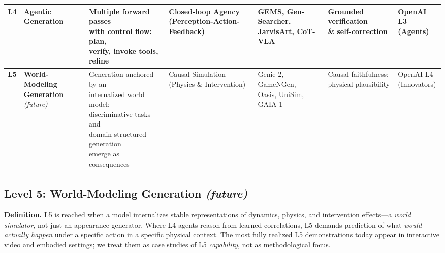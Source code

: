 \begin{table}[!htp]
{\begin{tabular}{@{}c l l l l l l@{}}
        \textbf{L4} & \textbf{Agentic Generation} & \makecell[l]{Multiple forward passes \\ with control flow: plan, \\ verify, invoke tools, refine} & \makecell[l]{Closed-loop Agency \\ (Perception-Action-Feedback)} & \makecell[l]{GEMS, Gen-Searcher, \\ JarvisArt, CoT-VLA} & \makecell[l]{Grounded verification \\ \& self-correction} & \makecell[l]{OpenAI L3 \\ (Agents)} \\ \midrule
        \textbf{L5} & \makecell[l]{\textbf{World-Modeling} \\ \textbf{Generation} \textit{(future)}} & \makecell[l]{Generation anchored by an \\ internalized world model; \\ discriminative tasks and \\ domain-structured generation \\ emerge as consequences} & \makecell[l]{Causal Simulation \\ (Physics \& Intervention)} & \makecell[l]{Genie 2, GameNGen, \\ Oasis, UniSim, GAIA-1} & \makecell[l]{Causal faithfulness; \\ physical plausibility} & \makecell[l]{OpenAI L4 \\ (Innovators)} \\
        \bottomrule[1pt]
    \end{tabular}%
    }
\end{table}



\subsection{Level 5: World-Modeling Generation \textit{(future)}}
\label{subsec:level5}

\textbf{Definition.} L5 is reached when a model internalizes stable representations of dynamics, physics, and intervention effects---a \emph{world simulator}, not just an appearance generator. Where L4 agents reason from learned correlations, L5 demands prediction of what \emph{would actually happen} under a specific action in a specific physical context. The most fully realized L5 demonstrations today appear in interactive video and embodied settings; we treat them as case studies of L5 \emph{capability}, not as methodological focus.

